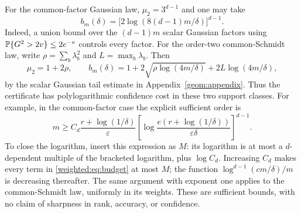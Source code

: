 \documentclass[11pt,a4paper]{article}
\theoremstyle{definition}\newtheorem{definition}[theorem]{Definition}
\theoremstyle{remark}\newtheorem{remark}[theorem]{Remark}
\numberwithin{equation}{section}
\begin{document}
For the common-factor Gaussian law, $\mu_2=3^{d-1}$ and one may take
\[
 b_m(\delta)=\bigl[2\log(8(d-1)m/\delta)\bigr]^{d-1}.
\]
Indeed, a union bound over the $(d-1)m$ scalar Gaussian factors using
$\mathbb P\{G^2>2v\}\le2e^{-v}$ controls every factor.
For the order-two common-Schmidt law, write
$\rho=\sum_b\lambda_b^2$ and $L=\max_b\lambda_b$. Then
\[
 \mu_2=1+2\rho,\qquad
 b_m(\delta)=1+2\sqrt{\rho\log(4m/\delta)}
                      +2L\log(4m/\delta),
\]
by the scalar Gaussian tail estimate in Appendix~\ref{geom:appendix}.
Thus the certificate has polylogarithmic confidence cost in these
two support classes. For example, in the common-factor case the
explicit sufficient order is
\[
 m\ge C_d\frac{r+\log(1/\delta)}{\varepsilon}
 \left[\log\frac{e(r+\log(1/\delta))}{\varepsilon\delta}\right]^{d-1}.
\]
To close the logarithm, insert this expression as $M$: its logarithm
is at most a $d$-dependent multiple of the bracketed logarithm, plus
$\log C_d$. Increasing $C_d$ makes every term in
\eqref{weighted:eq:budget} at most $M$; the function
$\log^{d-1}(cm/\delta)/m$ is decreasing thereafter. The same argument
with exponent one applies to the common-Schmidt law, uniformly in its
weights. These are sufficient bounds, with no claim of sharpness in
rank, accuracy, or confidence.
\end{document}
